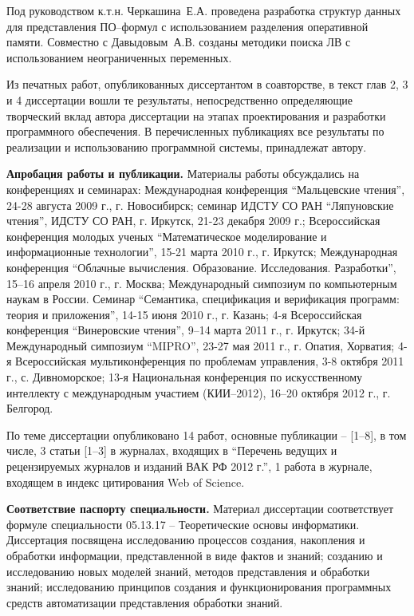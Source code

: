 \documentclass[a4paper]{report}
\begin{document}
Под руководством к.т.н. Черкашина~Е.А. проведена разработка структур данных для представления ПО--формул с использованием разделения оперативной памяти. Совместно с Давыдовым~А.В. созданы методики поиска ЛВ с использованием неограниченных переменных.

Из печатных работ, опубликованных диссертантом в соавторстве, в текст глав 2, 3 и 4 диссертации вошли те результаты, непосредственно определяющие творческий вклад автора диссертации на этапах проектирования и разработки программного обеспечения. В перечисленных публикациях все результаты по реализации и использованию программной системы, принадлежат автору.



\textbf{Апробация работы и публикации.}
Материалы работы обсуждались на конференциях и семинарах:
Международная конференция ``Мальцевские чтения'', 24-28 августа 2009 г., г. Новосибирск;
семинар ИДСТУ СО РАН ``Ляпуновские чтения'', ИДСТУ СО РАН, г. Иркутск, 21-23 декабря 2009 г.;
Всероссийская конференция молодых ученых ``Математическое моделирование и информационные технологии'', 15-21 марта 2010 г., г. Иркутск;
Международная конференция ``Облачные вычисления. Образование. Исследования. Разработки'', 15--16 апреля 2010 г., г. Москва;
Международный симпозиум по компьютерным наукам в России. Семинар ``Семантика, спецификация и верификация программ: теория и приложения'', 14-15 июня 2010 г., г. Казань;
4-я Всероссийская конференция ``Винеровские чтения'', 9--14 марта 2011 г., г. Иркутск;
34-й Международный симпозиум ``MIPRO'', 23-27 мая 2011 г., г. Опатия, Хорватия;
4-я Всероссийская мультиконференция по проблемам управления,  3-8 октября 2011 г., с. Дивноморское;
13-я Национальная конференция по искусственному интеллекту с международным участием (КИИ--2012), 16--20 октября 2012 г., г. Белгород.

По теме диссертации опубликовано 14 работ, основные публикации -- [1--8], в том числе, 3 статьи [1--3] в журналах, входящих в ``Перечень ведущих и рецензируемых журналов и изданий ВАК РФ 2012 г.'', 1 работа в журнале, входящем в индекс цитирования Web of Science.

\textbf{Соответствие паспорту специальности.}
Материал диссертации соответствует формуле специальности 05.13.17 -- Теоретические основы информатики. Диссертация посвящена исследованию процессов создания, накопления и обработки информации, представленной в виде фактов и знаний; созданию и исследованию новых моделей знаний, методов представления и обработки знаний; исследованию принципов создания и функционирования программных средств автоматизации представления обработки знаний.
\end{document}
